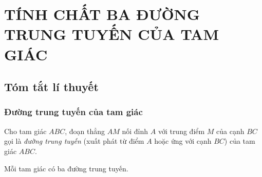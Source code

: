 
\section{TÍNH CHẤT BA ĐƯỜNG TRUNG TUYẾN CỦA TAM GIÁC}
\subsection{Tóm tắt lí thuyết}
\subsubsection{Đường trung tuyến của tam giác}
\begin{dn}
\immini
{
	 Cho tam giác $ABC$, đoạn thẳng $AM$ nối đỉnh $A$ với trung điểm $M$ của cạnh $BC$ gọi là \textit{đường trung tuyến} (xuất phát từ điểm $A$ hoặc ứng với cạnh $BC$) của tam giác $ABC$.
}
{}
\end{dn}
\begin{note}
		 Mỗi tam giác có ba đường trung tuyến.
\end{note}
